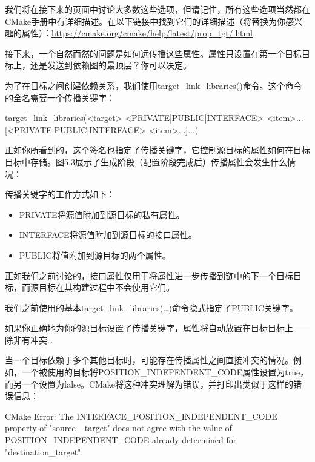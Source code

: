 我们将在接下来的页面中讨论大多数这些选项，但请记住，所有这些选项当然都在CMake手册中有详细描述。在以下链接中找到它们的详细描述（将替换为你感兴趣的属性）：\url{https://cmake.org/cmake/help/latest/prop_tgt/.html}

接下来，一个自然而然的问题是如何远传播这些属性。属性只设置在第一个目标目标上，还是发送到依赖图的最顶层？你可以决定。

为了在目标之间创建依赖关系，我们使用target\_link\_libraries()命令。这个命令的全名需要一个传播关键字：

\begin{shell}
target_link_libraries(<target>
                    <PRIVATE|PUBLIC|INTERFACE> <item>...
                    [<PRIVATE|PUBLIC|INTERFACE> <item>...]...)
\end{shell}

正如你所看到的，这个签名也指定了传播关键字，它控制源目标的属性如何在目标目标中存储。图5.3展示了生成阶段（配置阶段完成后）传播属性会发生什么情况：


传播关键字的工作方式如下：

\begin{itemize}
\item
PRIVATE将源值附加到源目标的私有属性。

\item
INTERFACE将源值附加到源目标的接口属性。

\item
PUBLIC将值附加到源目标的两个属性。
\end{itemize}

正如我们之前讨论的，接口属性仅用于将属性进一步传播到链中的下一个目标目标，而源目标在其构建过程中不会使用它们。

我们之前使用的基本target\_link\_libraries(…)命令隐式指定了PUBLIC关键字。

如果你正确地为你的源目标设置了传播关键字，属性将自动放置在目标目标上——除非有冲突…


当一个目标依赖于多个其他目标时，可能存在传播属性之间直接冲突的情况。例如，一个被使用的目标将POSITION\_INDEPENDENT\_CODE属性设置为true，而另一个设置为false。CMake将这种冲突理解为错误，并打印出类似于这样的错误信息：

\begin{shell}
CMake Error: The INTERFACE_POSITION_INDEPENDENT_CODE property of "source_ target" does not agree with the value of POSITION_INDEPENDENT_CODE already determined for "destination_target".
\end{shell}

